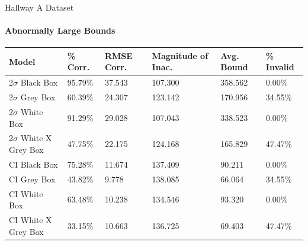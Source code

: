 \documentclass{beamer}
\begin{document}
\begin{frame}[t]{Hallway A Dataset}
  \framesubtitle{Abnormally Large Bounds}

  \vspace*{-0.5cm}
  \begin{table}[htp!]
  \small
  \begin{tabular}{|p{2.5cm}|p{1.3cm}|p{1.0cm}|p{1.7cm}|p{1.0cm}|p{1.5cm}|}

    \hline
    \textbf{Model} &
    \textbf{\% Corr.} &
    \textbf{RMSE Corr.} &
    \textbf{Magnitude of Inac.} &
    \textbf{Avg. Bound} &
    \textbf{\% Invalid} \\
    \hline

    2$\sigma$ Black Box &
    95.79\% &
    37.543 &
    107.300 &
    358.562 &
    0.00\% \\
    \hline

    2$\sigma$ Grey Box &
    60.39\% &
    24.307 &
    123.142 &
    170.956 &
    34.55\% \\
    \hline

    2$\sigma$ White Box &
    91.29\% &
    29.028 &
    107.043 &
    338.523 &
    0.00\% \\
    \hline

    2$\sigma$ White X Grey Box &
    47.75\% &
    22.175 &
    124.168 &
    165.829 &
    47.47\% \\
    \hline

    CI Black Box &
    75.28\% &
    11.674 &
    137.409 &
    90.211 &
    0.00\% \\
    \hline

    CI Grey Box &
    43.82\% &
    9.778 &
    138.085 &
    66.064 &
    34.55\% \\
    \hline

    CI White Box &
    63.48\% &
    10.238 &
    134.546 &
    93.320 &
    0.00\% \\
    \hline

    CI White X Grey Box &
    33.15\% &
    10.663 &
    136.725 &
    69.403 &
    47.47\% \\
    \hline



\end{tabular}
\end{table}

\end{frame}
\end{document}
